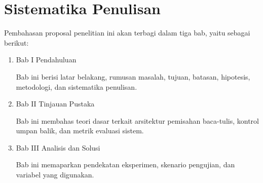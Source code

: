 \section{Sistematika Penulisan}

Pembahasan proposal penelitian ini akan terbagi dalam tiga bab, yaitu sebagai berikut:

\begin{enumerate}
\item Bab I Pendahuluan

Bab ini berisi latar belakang, rumusan masalah, tujuan, batasan, hipotesis, metodologi, dan sistematika penulisan.

\item Bab II Tinjauan Pustaka

Bab ini membahas teori dasar terkait arsitektur pemisahan baca-tulis, kontrol umpan balik, dan metrik evaluasi sistem.

\item Bab III Analisis dan Solusi

Bab ini memaparkan pendekatan eksperimen, skenario pengujian, dan variabel yang digunakan.
\end{enumerate}
